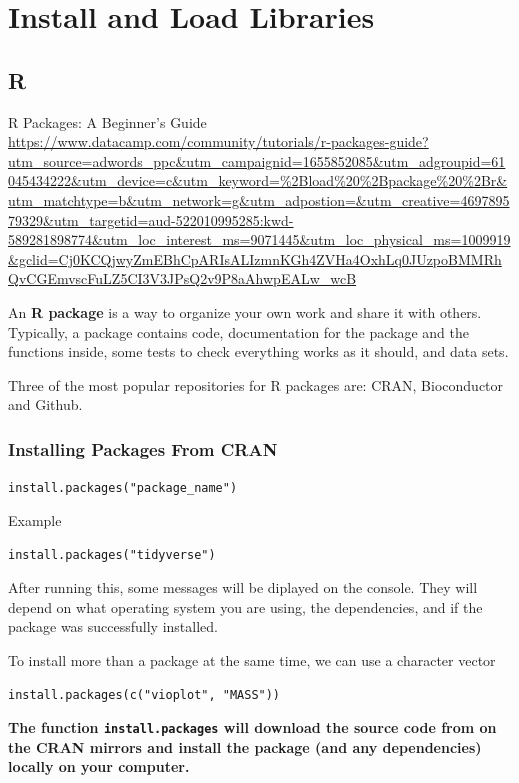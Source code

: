 \documentclass[
]{book}
\begin{document}
\hypertarget{install-and-load-libraries}{%
\section{Install and Load Libraries}\label{install-and-load-libraries}}

\hypertarget{r-4}{%
\subsection{R}\label{r-4}}

R Packages: A Beginner's Guide \url{https://www.datacamp.com/community/tutorials/r-packages-guide?utm_source=adwords_ppc\&utm_campaignid=1655852085\&utm_adgroupid=61045434222\&utm_device=c\&utm_keyword=\%2Bload\%20\%2Bpackage\%20\%2Br\&utm_matchtype=b\&utm_network=g\&utm_adpostion=\&utm_creative=469789579329\&utm_targetid=aud-522010995285:kwd-589281898774\&utm_loc_interest_ms=9071445\&utm_loc_physical_ms=1009919\&gclid=Cj0KCQjwyZmEBhCpARIsALIzmnKGh4ZVHa4OxhLq0JUzpoBMMRhQvCGEmvscFuLZ5CI3V3JPsQ2v9P8aAhwpEALw_wcB}

An \textbf{R package} is a way to organize your own work and share it with others. Typically, a package contains code, documentation for the package and the functions inside, some tests to check everything works as it should, and data sets.

Three of the most popular repositories for R packages are: CRAN, Bioconductor and Github.

\hypertarget{installing-packages-from-cran}{%
\subsubsection{Installing Packages From CRAN}\label{installing-packages-from-cran}}

\texttt{install.packages("package\_name")}

Example

\texttt{install.packages("tidyverse")}

After running this, some messages will be diplayed on the console. They will depend on what operating system you are using, the dependencies, and if the package was successfully installed.

To install more than a package at the same time, we can use a character vector

\texttt{install.packages(c("vioplot",\ "MASS"))}

\textbf{The function \texttt{install.packages} will download the source code from on the CRAN mirrors and install the package (and any dependencies) locally on your computer.}
\end{document}
